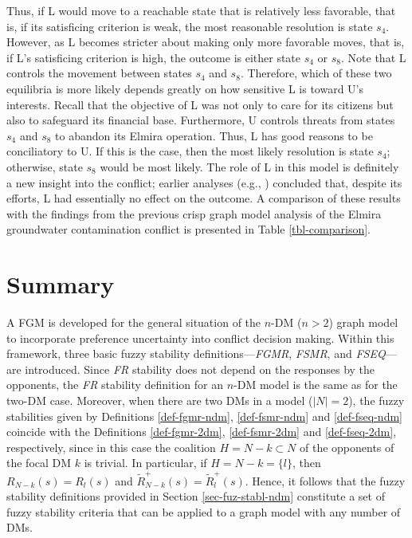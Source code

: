 Thus, if L would move to a reachable state that is relatively less favorable, that is, if its satisficing criterion is weak, the most reasonable resolution is state $s_4$. However, as L becomes stricter about making only more favorable moves, that is, if L's satisficing criterion is high, the outcome is either state $s_4$ or $s_8$. Note that L controls the movement between states $s_4$ and $s_8$. Therefore, which of these two equilibria is more likely depends greatly on how sensitive L is toward U's interests. Recall that the objective of L was not only to care for its citizens but also to safeguard its financial base. Furthermore, U controls threats from states $s_4$ and $s_8$ to abandon its Elmira operation. Thus, L has good reasons to be conciliatory to U. If this is the case, then the most likely resolution is state $s_4$; otherwise, state $s_8$ would be most likely. The role of L in this model is definitely a new insight into the conflict; earlier analyses (e.g., \citep{Hipel-et-al1993a}) concluded that, despite its efforts, L had essentially no effect on the outcome. A comparison of these results with the findings from the previous crisp graph model analysis of the Elmira groundwater contamination conflict \citep{Hipel-et-al1993a, Hipel-et-al1999, Kilgour-et-al2001} is presented in Table \ref{tbl-comparison}.


\section{Summary}

A FGM is developed for the general situation of the $n$-DM ($n>2$) graph model to incorporate preference uncertainty into conflict decision making. Within this framework, three basic fuzzy stability definitions---\emph{FGMR}, \emph{FSMR}, and \emph{FSEQ}---are introduced. Since \emph{FR} stability does not depend on the responses by the opponents, the \emph{FR} stability definition for an $n$-DM model is the same as for the two-DM case. Moreover, when there are two DMs in a model ($|N|=2$), the fuzzy stabilities given by Definitions \ref{def-fgmr-ndm}, \ref{def-fsmr-ndm} and \ref{def-fseq-ndm} coincide with the Definitions \ref{def-fgmr-2dm}, \ref{def-fsmr-2dm} and \ref{def-fseq-2dm}, respectively, since in this case the coalition $H=N-k \subset N$ of the opponents of the focal DM $k$ is trivial. In particular, if $H=N-k=\{l\}$, then $R_{N-k}(s)=R_l(s)$ and $\widetilde{R}_{N-k}^+(s)=\widetilde{R}_l^+(s)$. Hence, it follows that the fuzzy stability definitions provided in Section \ref{sec-fuz-stabl-ndm} constitute a set of fuzzy stability criteria that can be applied to a graph model with any number of DMs.

